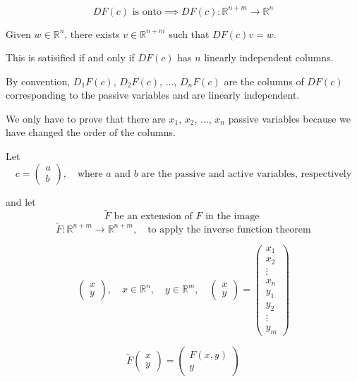 \documentclass[11pt]{article}
\begin{document}
\[
DF(c) \text{ is onto} \implies DF(c) : \mathbb{R}^{n+m} \rightarrow \mathbb{R}^n
\]

Given $w \in \mathbb{R}^n$, there exists $v \in \mathbb{R}^{n+m}$ such that $DF(c) v = w$.

This is satisified if and only if $DF(c)$ has $n$ linearly independent columns.

By convention, $D_1 F(c)$, $D_2 F(c)$, $\ldots$, $D_n F(c)$ are the columns of $DF(c)$ corresponding to the passive variables and are linearly independent.

We only have to prove that there are $x_1$, $x_2$, $\ldots$, $x_n$ passive variables because we have changed the order of the columns.

Let 
\[
c = \begin{pmatrix}
    a \\
    b
\end{pmatrix}, \quad \text{where } a \text{ and } b \text{ are the passive and active variables, respectively}
\]

and let 
\[
\tilde{F} \text{ be an extension of } F \text{ in the image }
\]
\[
\tilde{F} : \mathbb{R}^{n+m} \rightarrow \mathbb{R}^{n+m}, \quad \text{to apply the inverse function theorem}   
\]

\[
\begin{pmatrix}
    x \\
    y
\end{pmatrix}, \quad x \in \mathbb{R}^n, \quad y \in \mathbb{R}^m, \quad \begin{pmatrix}
    x \\
    y
\end{pmatrix} = \begin{pmatrix}
    x_1 \\
    x_2 \\
    \vdots \\
    x_n \\
    y_1 \\
    y_2 \\
    \vdots \\
    y_m
\end{pmatrix}
\]

\[
\tilde{F}\begin{pmatrix}
    x \\
    y
\end{pmatrix} = \begin{pmatrix}
    F(x,y) \\
    y
\end{pmatrix}
\]
\end{document}
